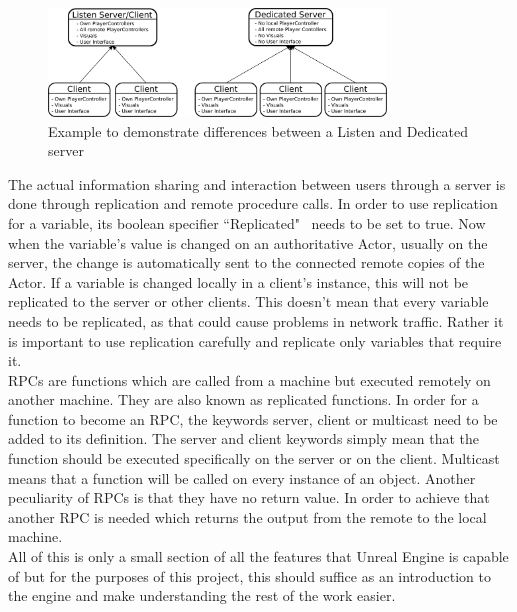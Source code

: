 \begin{figure}[htpb]
	\centering
	\includegraphics[width=0.8\textwidth]{fig/ListenvsDedicated.pdf}
	\caption[Difference between Listen and Dedicated Server]{Example to demonstrate differences between a Listen and Dedicated server\protect}
	\label{fig:ListenvDedicated}
\end{figure}

The actual information sharing and interaction between users through a server is done through replication and remote procedure calls\cite{bib:NetworkComp}. In order to use replication for a variable, its boolean specifier ``Replicated" ~needs to be set to true. Now when the variable's value is changed on an authoritative Actor, usually on the server, the change is automatically sent to the connected remote copies of the Actor. If a variable is changed locally in a client's instance, this will not be replicated to the server or other clients. This doesn't mean that every variable needs to be replicated, as that could cause problems in network traffic. Rather it is important to use replication carefully and replicate only variables that require it.\\
\acp{RPC} are functions which are called from a machine but executed remotely on another machine. They are also known as replicated functions\cite{bib:NetworkComp}. In order for a function to become an RPC, the keywords server, client or multicast need to be added to its definition. The server and client keywords simply mean that the function should be executed specifically on the server or on the client. Multicast means that a function will be called on every instance of an object. Another peculiarity of RPCs is that they have no return value. In order to achieve that another RPC is needed which returns the output from the remote to the local machine.\\
All of this is only a small section of all the features that Unreal Engine is capable of but for the purposes of this project, this should suffice as an introduction to the engine and make understanding the rest of the work easier.




